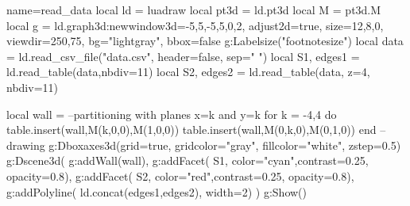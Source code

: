 \documentclass[border=5pt]{standalone}%
\begin{document}
\begin{luadraw}{name=read_data}
local ld = luadraw
local pt3d = ld.pt3d
local M = pt3d.M
local g = ld.graph3d:new{window3d={-5,5,-5,5,0,2}, adjust2d=true, 
    size={12,8,0}, viewdir={250,75}, bg="lightgray", bbox=false}
g:Labelsize("footnotesize")
local data = ld.read_csv_file("data.csv", {header=false, sep=" "})
local S1, edges1 = ld.read_table(data,{nbdiv=11})
local S2, edges2 = ld.read_table(data, {z=4, nbdiv=11})

local wall = {} --partitioning with planes x=k and y=k
for k = -4,4 do 
    table.insert(wall,{M(k,0,0),M(1,0,0)})
    table.insert(wall,{M(0,k,0),M(0,1,0)})
end
-- drawing
g:Dboxaxes3d({grid=true, gridcolor="gray", fillcolor="white", zstep=0.5})
g:Dscene3d( 
    g:addWall(wall),
    g:addFacet( S1, {color="cyan",contrast=0.25, opacity=0.8}),
    g:addFacet( S2, {color="red",contrast=0.25, opacity=0.8}),
    g:addPolyline( ld.concat(edges1,edges2), {width=2})
    )
g:Show()
\end{luadraw}
\end{document}
